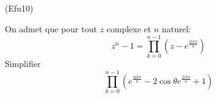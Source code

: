 \begin{tiny}(Efu10)\end{tiny} On admet que pour tout $z$ complexe et $n$ naturel:
\begin{displaymath}
 z^n-1 = \prod_{k=0}^{n-1}(z-e^{\frac{2ik\pi}{n}})
\end{displaymath}
Simplifier
\begin{displaymath}
 \prod_{k=0}^{n-1}\left(e^{\frac{4ik\pi}{n}}-2\cos\theta e^{\frac{2ik\pi}{n}} +1 \right) 
\end{displaymath}
